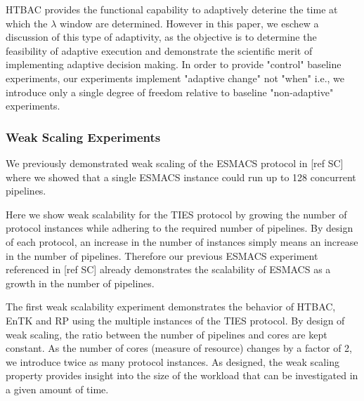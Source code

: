 HTBAC provides the functional capability to adaptively deterine the time at
which the $\lambda$ window are determined. However in this paper, we eschew a
discussion of this type of adaptivity, as the objective is to determine the
feasibility of adaptive execution and demonstrate the scientific merit of
implementing adaptive decision making. In order to provide "control" baseline
experiments, our experiments implement "adaptive change" not "when" i.e., we
introduce only a single degree of freedom relative to baseline "non-adaptive"
experiments.

\subsubsection{Weak Scaling Experiments}

We previously demonstrated weak scaling of the ESMACS protocol in [ref SC] where 
we showed that a single ESMACS instance could run up to 128 concurrent pipelines. 

Here we show weak scalability for the TIES protocol by growing the number of
protocol instances while adhering to the required number of pipelines. By
design of each protocol, an increase in the number of instances simply means
an increase in the number of pipelines. Therefore our previous ESMACS
experiment referenced in [ref SC] already demonstrates the scalability of
ESMACS as a growth in the number of pipelines.

The first weak scalability experiment demonstrates the behavior of HTBAC, EnTK
and RP using the multiple instances of the TIES protocol. By design of weak
scaling, the ratio between the number of pipelines and cores are kept
constant.  As the number of
cores (measure of resource) changes by a factor of 2, we introduce twice as
many protocol instances. As designed, the weak scaling property provides
insight into the size of the workload that can be investigated in a given
amount of time.




